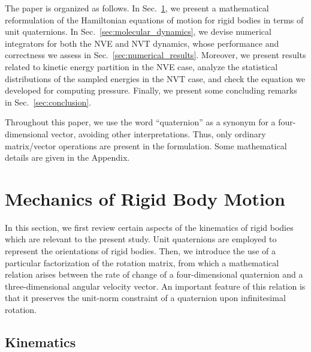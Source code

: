 \documentclass[aip,jcp,reprint,amsmath,amssymb]{revtex4-1}
\begin{document}
The paper is organized as follows. In Sec.~\ref{sec:mechanics}, we present a mathematical reformulation of the Hamiltonian equations of motion for rigid bodies in terms of unit quaternions. In Sec.~\ref{sec:molecular_dynamics}, we devise numerical integrators for both the NVE and NVT dynamics, whose performance and correctness we assess in Sec.~\ref{sec:numerical_results}. Moreover, we present results related to kinetic energy partition in the NVE case, analyze the statistical distributions of the sampled energies in the NVT case, and check the equation we developed for computing pressure. Finally, we present some concluding remarks in Sec.~\ref{sec:conclusion}.

Throughout this paper, we use the word ``quaternion'' as a synonym for a four-dimensional vector, avoiding other interpretations. Thus, only ordinary matrix/vector operations are present in the formulation. Some mathematical details are given in the Appendix.

\section{Mechanics of Rigid Body Motion}
\label{sec:mechanics}

In this section, we first review certain aspects of the kinematics of rigid bodies which are relevant to the present study. Unit quaternions are employed to represent the orientations of rigid bodies. Then, we introduce the use of a particular factorization of the rotation matrix, from which a mathematical relation arises between the rate of change of a four-dimensional quaternion and a three-dimensional angular velocity vector. An important feature of this relation is that it preserves the unit-norm constraint of a quaternion upon infinitesimal rotation.

\subsection{Kinematics}
\label{sec:kinematics}
\end{document}
